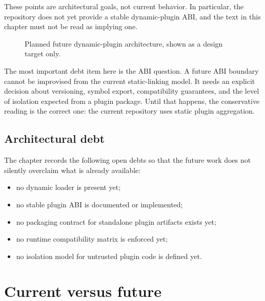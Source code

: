 These points are architectural goals, not current behavior. In particular, the
repository does not yet provide a stable dynamic-plugin ABI, and the text in
this chapter must not be read as implying one.

\begin{figure}[htbp]
\caption{Planned future dynamic-plugin architecture, shown as a design target only.}
\label{fig:plugin-future-dynamic-architecture}
\end{figure}

The most important debt item here is the ABI question. A future ABI boundary
cannot be improvised from the current static-linking model. It needs an
explicit decision about versioning, symbol export, compatibility guarantees,
and the level of isolation expected from a plugin package. Until that happens,
the conservative reading is the correct one: the current repository uses static
plugin aggregation.

\subsection{Architectural debt}
\label{subsec:plugin-architectural-debt}

The chapter records the following open debts so that the future work does not
silently overclaim what is already available:
\begin{itemize}
 \item no dynamic loader is present yet;
 \item no stable plugin ABI is documented or implemented;
 \item no packaging contract for standalone plugin artifacts exists yet;
 \item no runtime compatibility matrix is enforced yet;
 \item no isolation model for untrusted plugin code is defined yet.
\end{itemize}

\section{Current versus future}
\label{sec:plugin-current-vs-future}

